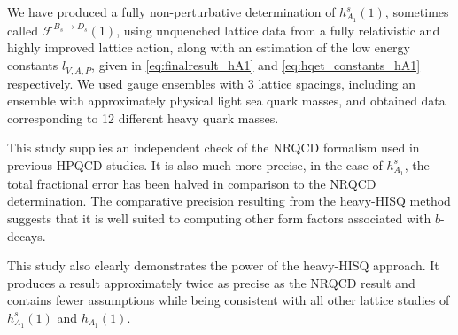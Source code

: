 We have produced a fully non-perturbative determination of $h_{A_1}^s(1)$, sometimes called $\mathcal{F}^{B_s\to D_s}(1)$, using unquenched lattice data from a fully relativistic and highly improved lattice action, along with an estimation of the low energy constants $l_{V,A,P}$, given in \eqref{eq:finalresult_hA1} and \eqref{eq:hqet_constants_hA1} respectively. We used gauge ensembles with 3 lattice spacings, including an ensemble with approximately physical light sea quark masses, and obtained data corresponding to 12 different heavy quark masses.

This study supplies an independent check of the NRQCD formalism used in previous HPQCD studies. It is also much more precise, in the case of $h_{A_1}^s$, the total fractional error has been halved in comparison to the NRQCD determination. The comparative precision resulting from the heavy-HISQ method suggests that it is well suited to computing other form factors associated with $b$-decays.

This study also clearly demonstrates the power of the heavy-HISQ approach. It produces a result approximately twice as precise as the NRQCD result and contains fewer assumptions while being consistent with all other lattice studies of $h^s_{A_1}(1)$ and $h_{A_1}(1)$. 


